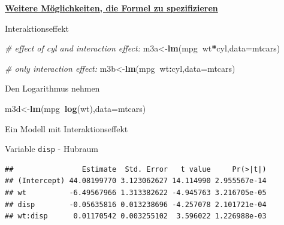 \documentclass[ignorenonframetext,]{beamer}
\newenvironment{Shaded}{\begin{snugshade}}{\end{snugshade}}
\newcommand{\KeywordTok}[1]{\textcolor[rgb]{0.13,0.29,0.53}{\textbf{#1}}}
\newcommand{\DataTypeTok}[1]{\textcolor[rgb]{0.13,0.29,0.53}{#1}}
\newcommand{\StringTok}[1]{\textcolor[rgb]{0.31,0.60,0.02}{#1}}
\newcommand{\CommentTok}[1]{\textcolor[rgb]{0.56,0.35,0.01}{\textit{#1}}}
\newcommand{\OperatorTok}[1]{\textcolor[rgb]{0.81,0.36,0.00}{\textbf{#1}}}
\newcommand{\NormalTok}[1]{#1}
\begin{document}
\begin{frame}[fragile]{\href{https://cran.r-project.org/web/packages/Formula/vignettes/Formula.pdf}{\textbf{Weitere
Möglichkeiten, die Formel zu spezifizieren}}}

\begin{block}{Interaktionseffekt}

\begin{Shaded}
\begin{Highlighting}[]
\CommentTok{# effect of cyl and interaction effect:}
\NormalTok{m3a<-}\KeywordTok{lm}\NormalTok{(mpg}\OperatorTok{~}\NormalTok{wt}\OperatorTok{*}\NormalTok{cyl,}\DataTypeTok{data=}\NormalTok{mtcars) }

\CommentTok{# only interaction effect:}
\NormalTok{m3b<-}\KeywordTok{lm}\NormalTok{(mpg}\OperatorTok{~}\NormalTok{wt}\OperatorTok{:}\NormalTok{cyl,}\DataTypeTok{data=}\NormalTok{mtcars) }
\end{Highlighting}
\end{Shaded}

\end{block}

\begin{block}{Den Logarithmus nehmen}

\begin{Shaded}
\begin{Highlighting}[]
\NormalTok{m3d<-}\KeywordTok{lm}\NormalTok{(mpg}\OperatorTok{~}\KeywordTok{log}\NormalTok{(wt),}\DataTypeTok{data=}\NormalTok{mtcars) }
\end{Highlighting}
\end{Shaded}

\end{block}

\end{frame}

\begin{frame}[fragile]{Ein Modell mit Interaktionseffekt}

\begin{block}{Variable \texttt{disp} - Hubraum}

\begin{Shaded}
\end{Shaded}

\begin{verbatim}
##                Estimate  Std. Error   t value     Pr(>|t|)
## (Intercept) 44.08199770 3.123062627 14.114990 2.955567e-14
## wt          -6.49567966 1.313382622 -4.945763 3.216705e-05
## disp        -0.05635816 0.013238696 -4.257078 2.101721e-04
## wt:disp      0.01170542 0.003255102  3.596022 1.226988e-03
\end{verbatim}

\end{block}

\end{frame}
\end{document}
